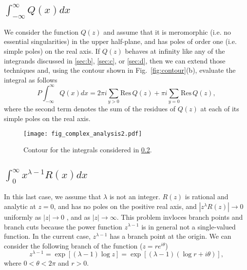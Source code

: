 \documentclass[11pt, letterpaper]{article}
\begin{document}
\subsection{$\displaystyle\int_{-\infty}^{\infty}Q(x)dx$}
\label{sec:e}
We consider the function $Q(z)$ and assume that it is meromorphic (i.e. no essential singularities) in the upper half-plane,
and has poles of order one (i.e. simple poles) on the real axis. If $Q(z)$ behaves at infinity like any of the integrands
discussed in \ref{sec:b}, \ref{sec:c}, or \ref{sec:d}, then we can extend those techniques and, using the contour shown
in Fig.~\ref{fig:contour}(b), evaluate the integral as follows
\begin{equation}
P\int_{-\infty}^{\infty}Q(x)dx = 2\pi i\sum_{y>0}\mbox{Res}\,Q(z) + \pi i\sum_{y=0}\mbox{Res}\,Q(z),
\end{equation}
where the second term denotes the sum of the residues of $Q(z)$ at each of its simple poles on the real axis.


\begin{figure}
\texttt{[image: fig\_complex\_analysis2.pdf]}
\caption{Contour for the integrals considered in \ref{sec:f}.}
\label{fig:contour2}
\end{figure}

\subsection{$\displaystyle\int_0^{\infty} x^{\lambda-1}R(x)dx$}
\label{sec:f}
In this last case, we assume that $\lambda$ is not an integer. $R(z)$ is rational and analytic at $z=0$, and has no poles on the
positive real axis, and $|z^\lambda R(z)|\rightarrow 0$ uniformly as $|z|\rightarrow 0$ , and as $|z|\rightarrow \infty$.
This problem invloces branch points and branch cuts because the power function $z^{\lambda-1}$ is in general not a single-valued
function. In the current case,  $z^{\lambda-1}$ has a branch point at the origin. We can consider the following branch of the
function ($z=re^{i\theta}$)
\begin{equation}
	z^{\lambda-1} = \exp\left[(\lambda-1)\log z\right] = \exp\left[(\lambda -1)(\log r+ i\theta)\right],
\end{equation}
where $0 < \theta < 2\pi$ and $r > 0$. 
\end{document}
